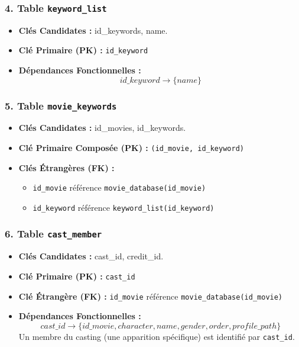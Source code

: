 \documentclass[12pt]{article}
\begin{document}
\subsubsection{4. Table \texttt{keyword\_list}}
\begin{itemize}
     \item \textbf{Clés Candidates :} id\_keywords, name.
    \item \textbf{Clé Primaire (PK) :} \texttt{id\_keyword}
    \item \textbf{Dépendances Fonctionnelles :}
    \[ id\_keyword \rightarrow \{ name \} \]
\end{itemize}

\subsubsection{5. Table \texttt{movie\_keywords}}
\begin{itemize}
     \item \textbf{Clés Candidates :} id\_movies, id\_keywords.
    \item \textbf{Clé Primaire Composée (PK) :} \texttt{(id\_movie, id\_keyword)}
    \item \textbf{Clés Étrangères (FK) :}
        \begin{itemize}
            \item \texttt{id\_movie} référence \texttt{movie\_database(id\_movie)}
            \item \texttt{id\_keyword} référence \texttt{keyword\_list(id\_keyword)}
        \end{itemize}
\end{itemize}

\subsubsection{6. Table \texttt{cast\_member}}
\begin{itemize}
    \item \textbf{Clés Candidates :} cast\_id, credit\_id.
    \item \textbf{Clé Primaire (PK) :} \texttt{cast\_id}
    \item \textbf{Clé Étrangère (FK) :} \texttt{id\_movie} référence \texttt{movie\_database(id\_movie)}
    \item \textbf{Dépendances Fonctionnelles :}
    \[ cast\_id \rightarrow \{ id\_movie, character, name, gender, order, profile\_path \} \]
    Un membre du casting (une apparition spécifique) est identifié par \texttt{cast\_id}.
\end{itemize}
\end{document}
